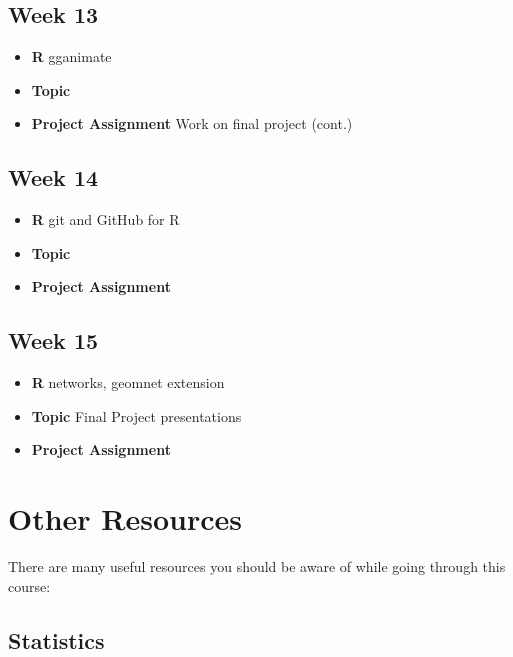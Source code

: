 \documentclass[]{book}
\providecommand{\tightlist}{%
  \setlength{\itemsep}{0pt}\setlength{\parskip}{0pt}}
\begin{document}
\subsection*{Week 13}\label{week-13}

\begin{itemize}
\tightlist
\item
  \textbf{R} gganimate
\item
  \textbf{Topic}
\item
  \textbf{Project Assignment} Work on final project (cont.)
\end{itemize}

\subsection*{Week 14}\label{week-14}

\begin{itemize}
\tightlist
\item
  \textbf{R} git and GitHub for R
\item
  \textbf{Topic}
\item
  \textbf{Project Assignment}
\end{itemize}

\subsection*{Week 15}\label{week-15}

\begin{itemize}
\tightlist
\item
  \textbf{R} networks, geomnet extension
\item
  \textbf{Topic} Final Project presentations
\item
  \textbf{Project Assignment}
\end{itemize}

\section*{Other Resources}\label{other-resources}

There are many useful resources you should be aware of while going
through this course:

\subsection*{Statistics}\label{statistics}
\end{document}
